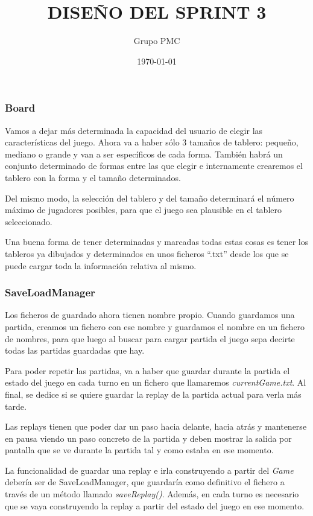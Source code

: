 \documentclass{article}
\title{DISEÑO DEL SPRINT 3}
\date{\today}
\author{Grupo PMC}
\begin{document}
\maketitle

\subsubsection*{Board}
Vamos a dejar más determinada la capacidad del usuario de elegir las características del juego. Ahora va a haber sólo 3 tamaños de tablero: pequeño, mediano o grande y van a ser específicos de cada forma. También habrá un conjunto determinado de formas entre las que elegir e internamente crearemos el tablero con la forma y el tamaño determinados.

Del mismo modo, la selección del tablero y del tamaño determinará el número máximo de jugadores posibles, para que el juego sea plausible en el tablero seleccionado.

Una buena forma de tener determinadas y marcadas todas estas cosas es tener los tableros ya dibujados y determinados en unos ficheros ``.txt'' desde los que se puede cargar toda la información relativa al mismo.

\subsubsection*{SaveLoadManager}
Los ficheros de guardado ahora tienen nombre propio. Cuando guardamos una partida, creamos un fichero con ese nombre y guardamos el nombre en un fichero de nombres, para que luego al buscar para cargar partida el juego sepa decirte todas las partidas guardadas que hay.

Para poder repetir las partidas, va a haber que guardar durante la partida el estado del juego en cada turno en un fichero que llamaremos \textit{currentGame.txt}. Al final, se dedice si se quiere guardar la replay de la partida actual para verla más tarde.

Las replays tienen que poder dar un paso hacia delante, hacia atrás y mantenerse en pausa viendo un paso concreto de la partida y deben mostrar la salida por pantalla que se ve durante la partida tal y como estaba en ese momento.

La funcionalidad de guardar una replay e irla construyendo a partir del \textit{Game} debería ser de SaveLoadManager, que guardaría como definitivo el fichero a través de un método llamado \textit{saveReplay()}. Además, en cada turno es necesario que se vaya construyendo la replay a partir del estado del juego en ese momento.
\end{document}

